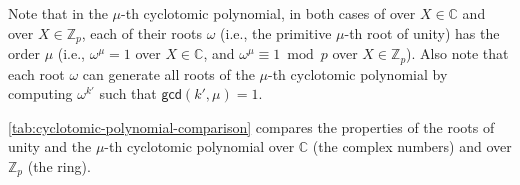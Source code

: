 Note that in the $\mu$-th cyclotomic polynomial, in both cases of over $X \in \mathbb{C}$ and over $X \in \mathbb{Z}_p$, each of their roots $\omega$ (i.e., the primitive $\mu$-th root of unity) has the order $\mu$ (i.e., $\omega^{\mu} = 1$ over $X \in \mathbb{C}$, and $\omega^{\mu} \equiv 1 \bmod p$ over $X \in \mathbb{Z}_p$). Also note that each root $\omega$ can generate all roots of the $\mu$-th cyclotomic polynomial by computing $\omega^{k'}$ such that $\textsf{gcd}(k', \mu) = 1$.

\autoref{tab:cyclotomic-polynomial-comparison} compares the properties of the roots of unity and the $\mu$-th cyclotomic polynomial over $\mathbb{C}$ (the complex numbers) and over $\mathbb{Z}_p$ (the ring).